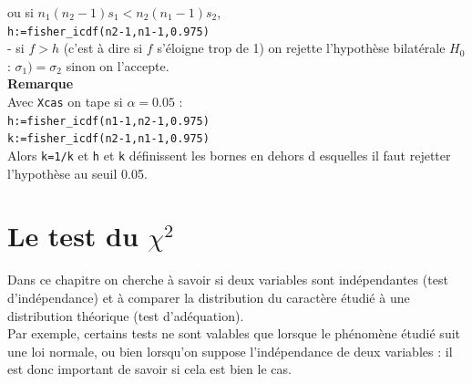 \documentclass[a4paper,11pt]{book}
\begin{document}
ou si $n_1(n_2-1)s_1<n_2(n_1-1)s_2$,\\ 
{\tt h:=fisher\_icdf(n2-1,n1-1,0.975)}\\
- si $f>h$ (c'est \`a dire si $f$ s'\'eloigne trop de 1) on rejette 
l'hypoth\`ese bilat\'erale $H_0$ : 
$\sigma_1)=\sigma_2$ sinon on l'accepte.\\
{\bf Remarque}\\
Avec {\tt Xcas} on tape si $\alpha=0.05$ :\\
{\tt h:=fisher\_icdf(n1-1,n2-1,0.975)} \\
{\tt k:=fisher\_icdf(n2-1,n1-1,0.975)}\\
Alors {\tt k=1/k} et {\tt h} et {\tt k} d\'efinissent les bornes en dehors d
esquelles il faut rejetter l'hypoth\`ese au seuil 0.05.
\section{Le test du $\chi^2$}
Dans ce chapitre on cherche \`a savoir si deux variables sont ind\'ependantes 
(test d'ind\'ependance) et \`a comparer la distribution du caract\`ere 
\'etudi\'e \`a une distribution th\'eorique (test d'ad\'equation).\\
Par exemple,  certains tests ne sont valables que lorsque le 
ph\'enom\`ene \'etudi\'e suit une loi normale, ou bien lorsqu'on suppose
l'ind\'ependance de deux variables : il est donc important de savoir
 si cela est bien le cas.
\end{document}
